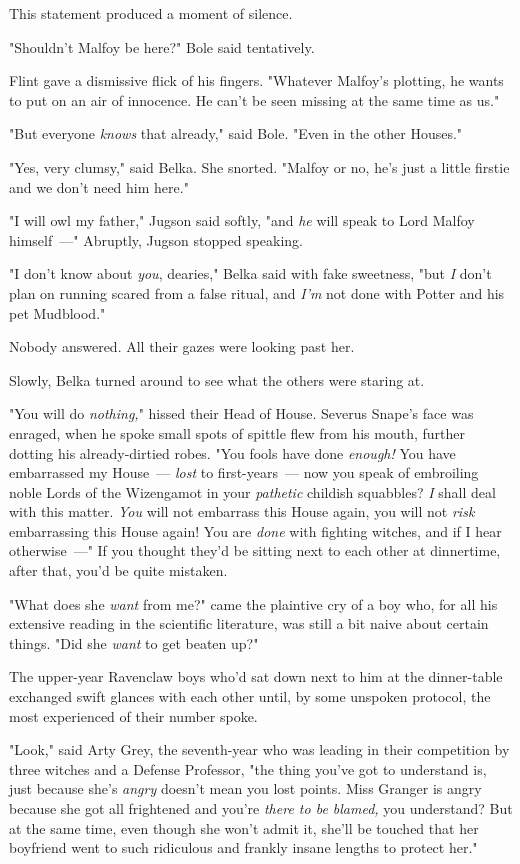 This statement produced a moment of silence.

"Shouldn't Malfoy be here?" Bole said tentatively.

Flint gave a dismissive flick of his fingers. "Whatever Malfoy's plotting, he
wants to put on an air of innocence. He can't be seen missing at the same time
as us."

"But everyone \emph{knows} that already," said Bole. "Even in the other Houses."

"Yes, very clumsy," said Belka. She snorted. "Malfoy or no, he's just a little
firstie and we don't need him here."

"I will owl my father," Jugson said softly, "and \emph{he} will speak to Lord
Malfoy himself~---" Abruptly, Jugson stopped speaking.

"I don't know about \emph{you}, dearies," Belka said with fake sweetness, "but
\emph{I} don't plan on running scared from a false ritual, and \emph{I'm} not
done with Potter and his pet Mudblood."

Nobody answered. All their gazes were looking past her.

Slowly, Belka turned around to see what the others were staring at.

"You will do \emph{nothing,}" hissed their Head of House. Severus Snape's face
was enraged, when he spoke small spots of spittle flew from his mouth, further
dotting his already-dirtied robes. "You fools have done \emph{enough!} You have
embarrassed my House~--- \emph{lost} to first-years~--- now you speak of embroiling
noble Lords of the Wizengamot in your \emph{pathetic} childish squabbles?
\emph{I} shall deal with this matter. \emph{You} will not embarrass this House
again, you will not \emph{risk} embarrassing this House again! You are
\emph{done} with fighting witches, and if I hear otherwise~---"
\sbreak
If you thought they'd be sitting next to each other at dinnertime, after that,
you'd be quite mistaken.

"What does she \emph{want} from me?" came the plaintive cry of a boy who, for
all his extensive reading in the scientific literature, was still a bit naive
about certain things. "Did she \emph{want} to get beaten up?"

The upper-year Ravenclaw boys who'd sat down next to him at the dinner-table
exchanged swift glances with each other until, by some unspoken protocol, the
most experienced of their number spoke.

"Look," said Arty Grey, the seventh-year who was leading in their competition
by three witches and a Defense Professor, "the thing you've got to understand
is, just because she's \emph{angry} doesn't mean you lost points. Miss Granger
is angry because she got all frightened and you're \emph{there to be blamed,}
you understand? But at the same time, even though she won't admit it, she'll be
touched that her boyfriend went to such ridiculous and frankly insane lengths
to protect her."

